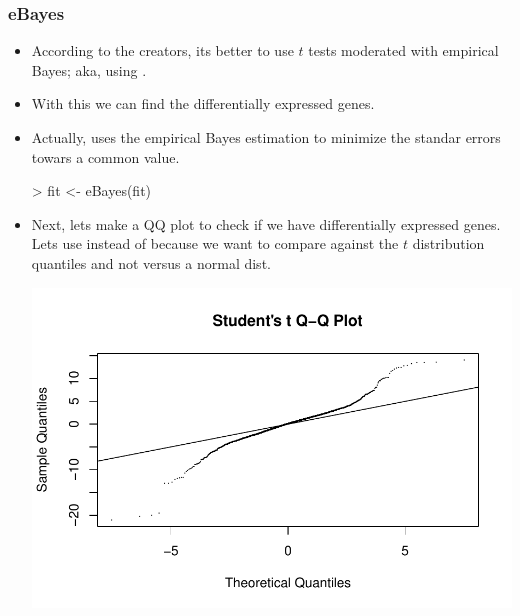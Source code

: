 \begin{frame}
  \frametitle{eBayes}
  \begin{itemize}
  \item According to the  creators, its better to use $t$ tests moderated with empirical Bayes; aka, using .
  \item With this we can find the differentially expressed genes.
  \item Actually,  uses the empirical Bayes estimation to minimize the standar errors towars a common value.
\begin{Schunk}
\begin{Sinput}
> fit <- eBayes(fit)
\end{Sinput}
\end{Schunk}
  \item Next, lets make a QQ plot to check if we have differentially expressed genes. Lets use  instead of  because we want to compare against the $t$ distribution quantiles and not versus a normal dist.
\begin{Schunk}
\end{Schunk}
\includegraphics{plots/fig-034}
  \end{itemize}
\end{frame}

